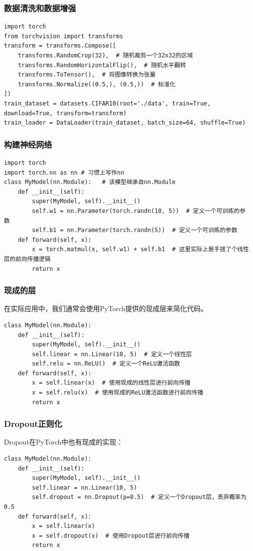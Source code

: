 \documentclass{ctexbeamer}
\begin{document}
\begin{frame}[fragile]
    \frametitle{数据清洗和数据增强}

    \begin{verbatim}
import torch
from torchvision import transforms
transform = transforms.Compose([
    transforms.RandomCrop(32),  # 随机裁剪一个32x32的区域
    transforms.RandomHorizontalFlip(),  # 随机水平翻转
    transforms.ToTensor(),  # 将图像转换为张量
    transforms.Normalize((0.5,), (0.5,))  # 标准化
])
train_dataset = datasets.CIFAR10(root='./data', train=True, download=True, transform=transform)
train_loader = DataLoader(train_dataset, batch_size=64, shuffle=True)
    \end{verbatim}

\end{frame}

\begin{frame}[fragile]
    \frametitle{构建神经网络}

    \begin{verbatim}
import torch
import torch.nn as nn # 习惯上写作nn
class MyModel(nn.Module):   # 该模型继承自nn.Module
    def __init__(self):
        super(MyModel, self).__init__()
        self.w1 = nn.Parameter(torch.randn(10, 5))  # 定义一个可训练的参数
        self.b1 = nn.Parameter(torch.randn(5))  # 定义一个可训练的参数
    def forward(self, x):
        x = torch.matmul(x, self.w1) + self.b1  # 这里实际上是手搓了个线性层的前向传播逻辑
        return x
    \end{verbatim}

\end{frame}

\begin{frame}[fragile]
    \frametitle{现成的层}

    在实际应用中，我们通常会使用PyTorch提供的现成层来简化代码。

    \begin{verbatim}
class MyModel(nn.Module):
    def __init__(self):
        super(MyModel, self).__init__()
        self.linear = nn.Linear(10, 5)  # 定义一个线性层
        self.relu = nn.ReLU()  # 定义一个ReLU激活函数
    def forward(self, x):
        x = self.linear(x)  # 使用现成的线性层进行前向传播
        x = self.relu(x)  # 使用现成的ReLU激活函数进行前向传播
        return x
    \end{verbatim}

\end{frame}

\begin{frame}[fragile]
    \frametitle{Dropout正则化}

    Dropout在PyTorch中也有现成的实现：
    \begin{verbatim}
class MyModel(nn.Module):
    def __init__(self):
        super(MyModel, self).__init__()
        self.linear = nn.Linear(10, 5)
        self.dropout = nn.Dropout(p=0.5)  # 定义一个Dropout层，丢弃概率为0.5
    def forward(self, x):
        x = self.linear(x)
        x = self.dropout(x)  # 使用Dropout层进行前向传播
        return x
    \end{verbatim}

\end{frame}
\end{document}
